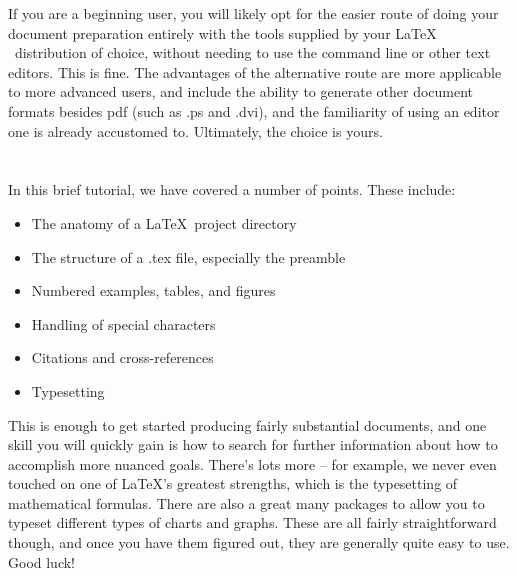 If you are a beginning user, you will likely opt for the easier route of doing
your document preparation entirely with the tools supplied by your \LaTeX
~distribution of choice, without needing to use the command line or other text
editors. This is fine. The advantages of the alternative route are more
applicable to more advanced users, and include the ability to generate other
document formats besides pdf (such as .ps and .dvi), and the familiarity of
using an editor one is already accustomed to. Ultimately, the choice is yours.

\section{}
In this brief tutorial, we have covered a number of points. These include:

\begin{itemize}
  \item The anatomy of a \LaTeX ~project directory
  \item The structure of a .tex file, especially the preamble
  \item Numbered examples, tables, and figures
  \item Handling of special characters
  \item Citations and cross-references
  \item Typesetting
\end{itemize}
This is enough to get started producing fairly substantial documents, and one
skill you will quickly gain is how to search for further information about
how to accomplish more nuanced goals. There's lots more -- for example, we
never even touched on one of \LaTeX's greatest strengths, which is the 
typesetting of mathematical formulas. There are also a great many packages to
allow you to typeset different types of charts and graphs. These are all
fairly straightforward though, and once you have them figured out, they are
generally quite easy to use. Good luck!
   
   
